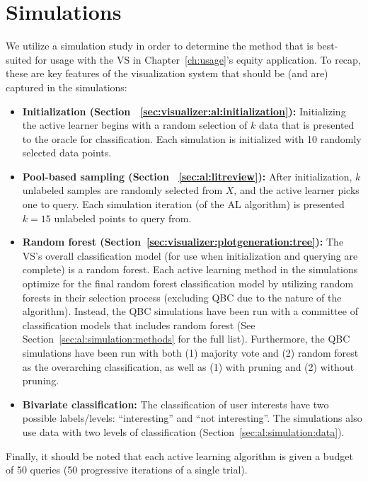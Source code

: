 \section{Simulations}
\label{sec:al:simulations}

We utilize a simulation study in order to determine the method that is 
best-suited for usage with the VS in Chapter~\ref{ch:usage}'s equity 
application. To recap, these are key features of the visualization system that 
should be (and are) captured in the simulations:

\tablespacing
\begin{itemize}
	\item \textbf{Initialization (Section 
	~\ref{sec:visualizer:al:initialization}):} 
	Initializing the active learner begins with a random selection of $k$ data 
	that is presented to the oracle for classification. Each simulation is 
	initialized with 10 randomly selected data points.
	\item \textbf{Pool-based sampling (Section ~\ref{sec:al:litreview}):} After 
	initialization, $k$ unlabeled samples are randomly selected from $X$, and 
	the active learner picks one to query. Each simulation iteration (of the AL 
	algorithm) is presented $k=15$ unlabeled points to query from.
	\item \textbf{Random forest 
	(Section~\ref{sec:visualizer:plotgeneration:tree}):} The VS's overall 
	classification model (for use when initialization and querying are 
	complete) is a random forest. Each active learning method in the 
	simulations optimize for the 
	final random forest classification model by utilizing random forests in 
	their selection process (excluding QBC due to the nature of the 
	algorithm). Instead, the QBC simulations have been run with a committee of 
	classification models that includes random forest (See 
	Section~\ref{sec:al:simulation:methods} for the full list). Furthermore, 
	the QBC simulations have been run with both (1) majority vote and (2) 
	random forest as the overarching classification, as well as (1) with 
	pruning and (2) without pruning.
	\item \textbf{Bivariate classification:} The classification of user 
	interests have two possible labels/levels: ``interesting'' and ``not 
	interesting''. The simulations also use data with two levels of 
	classification (Section~\ref{sec:al:simulation:data}).
\end{itemize}
\bodyspacing

\noindent Finally, it should be noted that each active learning algorithm is 
given a budget of 50 queries (50 progressive iterations of a single trial).

